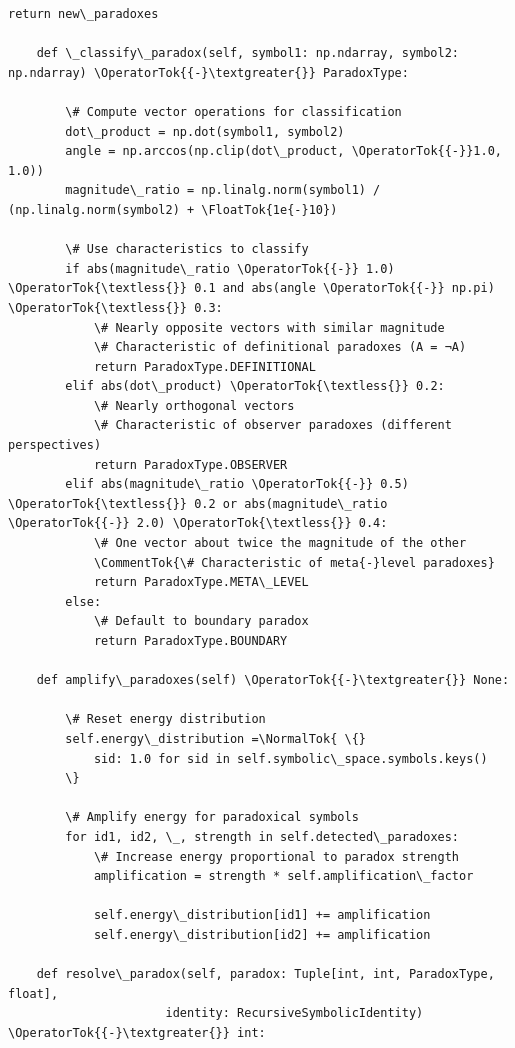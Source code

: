 \documentclass[12pt]{article}
\begin{document}
\begin{lstlisting}[basicstyle=\ttfamily\small]
        return new\_paradoxes
    
    def \_classify\_paradox(self, symbol1: np.ndarray, symbol2: np.ndarray) \OperatorTok{{-}\textgreater{}} ParadoxType:

        \# Compute vector operations for classification
        dot\_product = np.dot(symbol1, symbol2)
        angle = np.arccos(np.clip(dot\_product, \OperatorTok{{-}}1.0, 1.0))
        magnitude\_ratio = np.linalg.norm(symbol1) / (np.linalg.norm(symbol2) + \FloatTok{1e{-}10})
        
        \# Use characteristics to classify
        if abs(magnitude\_ratio \OperatorTok{{-}} 1.0) \OperatorTok{\textless{}} 0.1 and abs(angle \OperatorTok{{-}} np.pi) \OperatorTok{\textless{}} 0.3:
            \# Nearly opposite vectors with similar magnitude
            \# Characteristic of definitional paradoxes (A = ¬A)
            return ParadoxType.DEFINITIONAL
        elif abs(dot\_product) \OperatorTok{\textless{}} 0.2:
            \# Nearly orthogonal vectors
            \# Characteristic of observer paradoxes (different perspectives)
            return ParadoxType.OBSERVER
        elif abs(magnitude\_ratio \OperatorTok{{-}} 0.5) \OperatorTok{\textless{}} 0.2 or abs(magnitude\_ratio \OperatorTok{{-}} 2.0) \OperatorTok{\textless{}} 0.4:
            \# One vector about twice the magnitude of the other
            \CommentTok{\# Characteristic of meta{-}level paradoxes}
            return ParadoxType.META\_LEVEL
        else:
            \# Default to boundary paradox
            return ParadoxType.BOUNDARY
    
    def amplify\_paradoxes(self) \OperatorTok{{-}\textgreater{}} None:

        \# Reset energy distribution
        self.energy\_distribution =\NormalTok{ \{}
            sid: 1.0 for sid in self.symbolic\_space.symbols.keys()
        \}
        
        \# Amplify energy for paradoxical symbols
        for id1, id2, \_, strength in self.detected\_paradoxes:
            \# Increase energy proportional to paradox strength
            amplification = strength * self.amplification\_factor
            
            self.energy\_distribution[id1] += amplification
            self.energy\_distribution[id2] += amplification
    
    def resolve\_paradox(self, paradox: Tuple[int, int, ParadoxType, float], 
                      identity: RecursiveSymbolicIdentity) \OperatorTok{{-}\textgreater{}} int:


\end{lstlisting}
\end{document}
